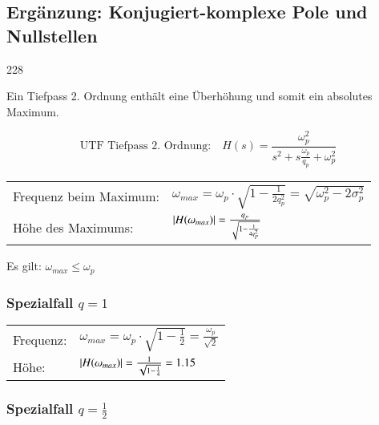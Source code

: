 \subsection{Ergänzung: Konjugiert-komplexe Pole und Nullstellen}{228}

Ein Tiefpass 2. Ordnung enthält eine Überhöhung und somit ein absolutes Maximum. 

$$ \text{UTF Tiefpass 2. Ordnung:} \quad H(s) = \frac{\omega_p^2}{s^2 + s \frac{\omega_p}{q_p} + \omega_p^2} $$

\renewcommand{\arraystretch}{2}
\begin{tabular}{ll}
    Frequenz beim Maximum:  & $ \omega_{max} = \omega_p \cdot \sqrt{1 - \frac{1}{2 q_p^2}} = \sqrt{\omega_p^2 - 2 \sigma_p^2}$ \\
    Höhe des Maximums:      & $ \left|H(\omega_{max})\right| = \frac{q_p}{\sqrt{1 - \frac{1}{4 q_p^2}}}$ \\
\end{tabular}

\textrightarrow Es gilt: $\omega_{max} \leq \omega_p$


\subsubsection{Spezialfall $q = 1$}

\renewcommand{\arraystretch}{1.5}
\begin{minipage}[t]{0.55\columnwidth}    
    \begin{tabular}{ll}
        Frequenz:  & $ \omega_{max} = \omega_p \cdot \sqrt{1 - \frac{1}{2}} = \frac{\omega_p}{\sqrt{2}}$ \\
        Höhe:      & $ \left|H(\omega_{max})\right| = \frac{1}{\sqrt{1 - \frac{1}{4}}} = 1.15$ \\
    \end{tabular}

\end{minipage}
\hfill
\begin{minipage}[t]{0.43\columnwidth}

\end{minipage}


\subsubsection{Spezialfall $q = \frac{1}{2}$}

